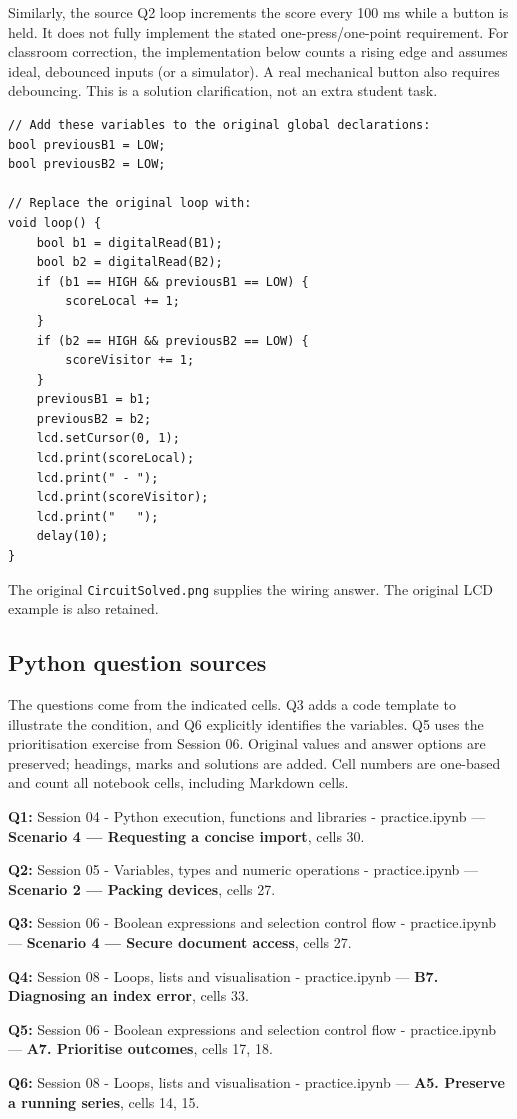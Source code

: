 \documentclass[10pt]{article}
\begin{document}
Similarly, the source Q2 loop increments the score every 100 ms while a button is held. It does not fully implement the stated one-press/one-point requirement. For classroom correction, the implementation below counts a rising edge and assumes ideal, debounced inputs (or a simulator). A real mechanical button also requires debouncing. This is a solution clarification, not an extra student task.
\begin{verbatim}
// Add these variables to the original global declarations:
bool previousB1 = LOW;
bool previousB2 = LOW;

// Replace the original loop with:
void loop() {
    bool b1 = digitalRead(B1);
    bool b2 = digitalRead(B2);
    if (b1 == HIGH && previousB1 == LOW) {
        scoreLocal += 1;
    }
    if (b2 == HIGH && previousB2 == LOW) {
        scoreVisitor += 1;
    }
    previousB1 = b1;
    previousB2 = b2;
    lcd.setCursor(0, 1);
    lcd.print(scoreLocal);
    lcd.print(" - ");
    lcd.print(scoreVisitor);
    lcd.print("   ");
    delay(10);
}
\end{verbatim}
The original \texttt{CircuitSolved.png} supplies the wiring answer. The original LCD example is also retained.
\clearpage\subsection*{Python question sources}
The questions come from the indicated cells. Q3 adds a code template to illustrate the condition, and Q6 explicitly identifies the variables. Q5 uses the prioritisation exercise from Session 06. Original values and answer options are preserved; headings, marks and solutions are added. Cell numbers are one-based and count all notebook cells, including Markdown cells.

\textbf{Q1:} Session 04 - Python execution, functions and libraries -
practice.ipynb --- \textbf{Scenario 4 --- Requesting a concise import},
cells 30.

\textbf{Q2:} Session 05 - Variables, types and numeric operations -
practice.ipynb --- \textbf{Scenario 2 --- Packing devices}, cells 27.

\textbf{Q3:} Session 06 - Boolean expressions and selection control flow
- practice.ipynb --- \textbf{Scenario 4 --- Secure document access},
cells 27.

\textbf{Q4:} Session 08 - Loops, lists and visualisation -
practice.ipynb --- \textbf{B7. Diagnosing an index error}, cells 33.

\textbf{Q5:} Session 06 - Boolean expressions and selection control flow -
practice.ipynb --- \textbf{A7. Prioritise outcomes}, cells 17, 18.

\textbf{Q6:} Session 08 - Loops, lists and visualisation -
practice.ipynb --- \textbf{A5. Preserve a running series}, cells 14, 15.
\end{document}
